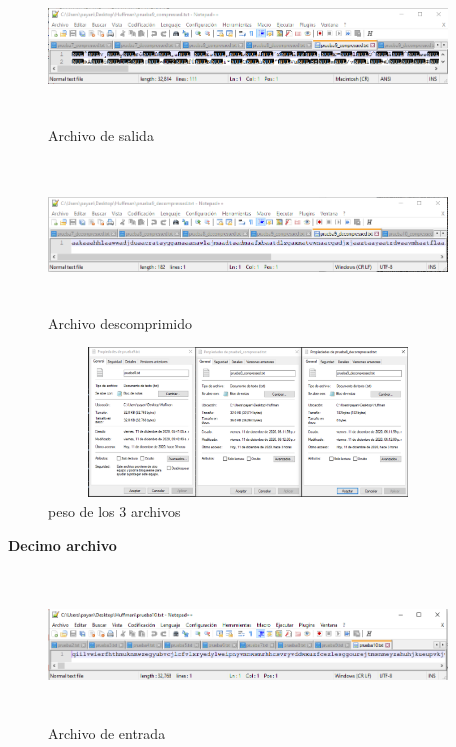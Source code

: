 \documentclass[spanish]{article}
\begin{document}
	\begin{figure}[H]
		\centering
		\includegraphics[width=400px,height=150px]{captura53}
		\caption{Archivo de salida}
	\end{figure}
	\begin{figure}[H]
		\centering
		\includegraphics[width=400px,height=150px]{captura54}
		\caption{Archivo descomprimido}
	\end{figure}
	\begin{figure}[H]
		\centering
		\includegraphics[width=400px,height=150px]{captura55}
		\caption{peso de los 3 archivos}
	\end{figure}
	\textbf{Decimo archivo}
	\begin{figure}[H]
		\centering
		\includegraphics[width=400px,height=150px]{captura56}
		\caption{Archivo de entrada}
	\end{figure}
\end{document}
